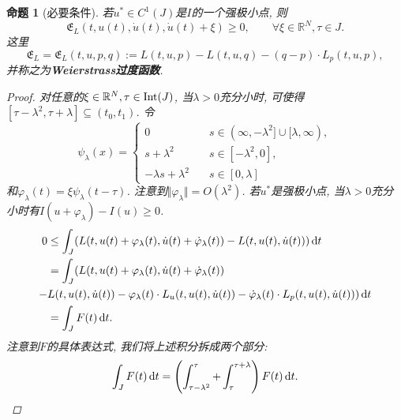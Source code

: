 \documentclass[12pt,a4paper]{article}
\newtheorem{proposition}[theorem]{命题}
\begin{document}
\begin{proposition}[必要条件]
    若$u^* \in C^1(J)$是$I$的一个强极小点, 则
    \begin{equation*}
        \mathfrak{E}_L(t, u(t), \dot u(t), \dot u(t) + \xi) \geq 0, \qquad \forall \xi \in \mathbb{R}^N, \tau \in J.
    \end{equation*}
    这里
    \begin{equation*}
        \boxed{\mathfrak{E}_L = \mathfrak{E}_L(t, u, p, q) := L(t, u, p) - L(t, u, q) - (q - p) \cdot L_p(t, u, p),}
    \end{equation*}
    并称之为\textbf{Weierstrass过度函数}.
    \begin{proof}
        对任意的$\xi \in \mathbb{R}^N, \tau \in {\rm Int}(J)$, 当$\lambda > 0$充分小时, 可使得$[\tau - \lambda^2, \tau+\lambda] \subseteq (t_0, t_1)$.
        令
        \begin{equation} 
            \psi_{\lambda}(x) =  
            \begin{cases} 
                0 \quad &s\in (\infty, -\lambda^2] \cup [\lambda, \infty), \\  
                s + \lambda^2 \quad &s \in [-\lambda^2, 0], \\  
                -\lambda s + \lambda^2 \quad &s \in [0, \lambda] 
        \end{cases} 
    \end{equation}
    和$\varphi_{\lambda}(t) = \xi\psi_{\lambda}(t - \tau)$. 注意到$\Vert \varphi_{\lambda}\Vert = O(\lambda^2)$. 若$u^*$是强极小点, 当$\lambda > 0$充分小时有$I(u + \varphi_{\lambda}) - I(u) \geq 0$.
    \begin{align*} 
        0 &\leq \int_J(L(t, u(t) + \varphi_{\lambda}(t), \dot u(t) + \dot\varphi_{\lambda}(t)) - L(t, u(t), \dot u(t))) \,{\rm d}t \\  
        &= \int_J(L(t, u(t) + \varphi_{\lambda}(t), \dot u(t) + \dot\varphi_{\lambda}(t)) \\
        - &L(t, u(t), \dot u(t)) - \varphi_{\lambda} (t) \cdot L_u(t, u(t), \dot u(t)) - \dot\varphi_{\lambda}(t) \cdot L_p(t, u(t), \dot u(t))) \,{\rm d}t \\ 
        &= \int_J F(t) \,{\rm d}t. 
    \end{align*}
    注意到$F$的具体表达式, 我们将上述积分拆成两个部分:
    \begin{equation*}
        \int_JF(t) \,{\rm d}t = \left(\int_{\tau - \lambda^2}^{\tau} + \int_{\tau}^{\tau + \lambda}\right)F(t) \,{\rm d}t.
    \end{equation*}

\end{proof}
\end{proposition}
\end{document}
